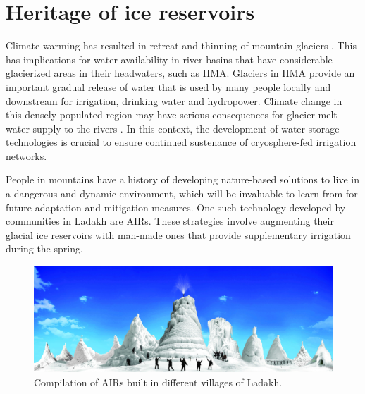 \chapter{Heritage of ice reservoirs}


Climate warming has resulted in retreat and thinning of mountain glaciers
\citep{ipccCrossChapterPaperMountains2022}. This has implications for water availability in river basins that
have considerable glacierized areas in their headwaters, such as \ac{HMA}. Glaciers in HMA provide an important
gradual release of water that is used by many people locally and downstream for irrigation, drinking water and
hydropower. Climate change in this densely populated region may have serious consequences for glacier melt water
supply to the rivers \citep{immerzeelImportanceVulnerabilityWorld2020}. In this context, the development of
water storage technologies is crucial to ensure continued sustenance of cryosphere-fed irrigation networks.

People in mountains have a history of developing nature-based solutions to live in a dangerous and dynamic
environment, which will be invaluable to learn from for future adaptation and mitigation measures. One such
technology developed by communities in Ladakh are \ac{AIRs}. These strategies involve augmenting their glacial
ice reservoirs with man-made ones that provide supplementary irrigation during the spring.

\begin{figure}[htb]
	\includegraphics[width=\textwidth]{figs/AIRs_Ladakh}
	\caption{Compilation of AIRs built in different villages of Ladakh.}
	\label{fig:airs_ladakh}
\end{figure}

